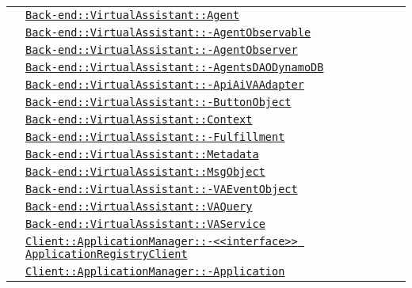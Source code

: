 \begin{longtable}{|>{\centering}m{3cm}|m{10cm}<{\centering}|}
& \hyperref[Back-end::VirtualAssistant::Agent]{\texttt{Back-end::VirtualAssistant::Agent}}\\
& \hyperref[Back-end::VirtualAssistant::AgentObservable]{\texttt{Back-end::VirtualAssistant::-\linebreak AgentObservable}}\\
& \hyperref[Back-end::VirtualAssistant::AgentObserver]{\texttt{Back-end::VirtualAssistant::-\linebreak AgentObserver}}\\
& \hyperref[Back-end::VirtualAssistant::AgentsDAODynamoDB]{\texttt{Back-end::VirtualAssistant::-\linebreak AgentsDAODynamoDB}}\\
& \hyperref[Back-end::VirtualAssistant::ApiAiVAAdapter]{\texttt{Back-end::VirtualAssistant::-\linebreak ApiAiVAAdapter}}\\
& \hyperref[Back-end::VirtualAssistant::ButtonObject]{\texttt{Back-end::VirtualAssistant::-\linebreak ButtonObject}}\\
& \hyperref[Back-end::VirtualAssistant::Context]{\texttt{Back-end::VirtualAssistant::Context}}\\
& \hyperref[Back-end::VirtualAssistant::Fulfillment]{\texttt{Back-end::VirtualAssistant::-\linebreak Fulfillment}}\\
& \hyperref[Back-end::VirtualAssistant::Metadata]{\texttt{Back-end::VirtualAssistant::Metadata}}\\
& \hyperref[Back-end::VirtualAssistant::MsgObject]{\texttt{Back-end::VirtualAssistant::MsgObject}}\\
& \hyperref[Back-end::VirtualAssistant::VAEventObject]{\texttt{Back-end::VirtualAssistant::-\linebreak VAEventObject}}\\
& \hyperref[Back-end::VirtualAssistant::VAQuery]{\texttt{Back-end::VirtualAssistant::VAQuery}}\\
& \hyperref[Back-end::VirtualAssistant::VAService]{\texttt{Back-end::VirtualAssistant::VAService}}\\
& \hyperref[Client::ApplicationManager::<<interface>> ApplicationRegistryClient]{\texttt{Client::ApplicationManager::-\linebreak <<interface>> ApplicationRegistryClient}}\\
& \hyperref[Client::ApplicationManager::Application]{\texttt{Client::ApplicationManager::-\linebreak Application}}\\

\end{longtable}
